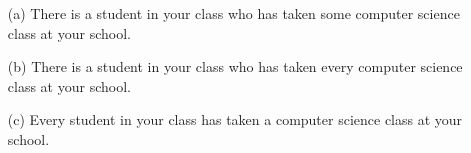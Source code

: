 \documentclass[12pt,addpoints]{exam}
\begin{document}
\begin{questions}
\begin{solution}
\begin{itemize}
        \item[(a)] There is a student in your class who has taken some computer science class at your school.
        \item[(b)] There is a student in your class who has taken every computer science class at your school.
        \item[(c)] Every student in your class has taken a computer science class at your school.
    \end{itemize}
    \end{solution}


\end{questions}
\end{document}
